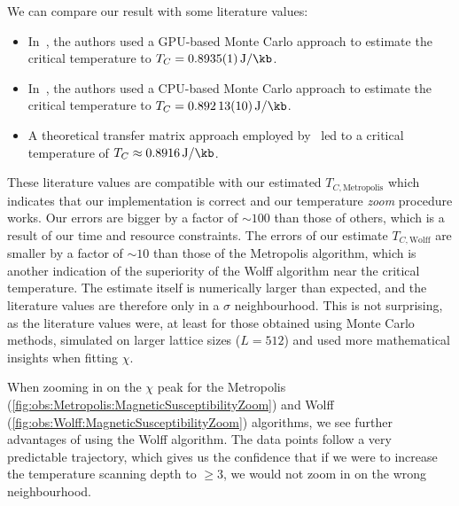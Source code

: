 		We can compare our result with some literature values:
		\begin{itemize}
			\item In~\citet{literature_gpu}, the authors used a GPU-based Monte Carlo approach to estimate the critical temperature to $T_C=\SI{0.8935(1)}{\J\per\kb}$.
			\item In~\citet{literature_cpu}, the authors used a CPU-based Monte Carlo approach to estimate the critical temperature to $T_C=\SI{0.89213(10)}{\J\per\kb}$.
			\item A theoretical transfer matrix approach employed by~\cite{literature_theo} led to a critical temperature of $T_C \approx \SI{0.8916}{\J\per\kb}$.
		\end{itemize}
		These literature values are compatible with our estimated $T_{C, \text{Metropolis}}$ which indicates that our implementation is correct and our temperature \emph{zoom} procedure works. Our errors are bigger by a factor of $\sim 100$ than those of others, which is a result of our time and resource constraints. The errors of our estimate $T_{C, \text{Wolff}}$ are smaller by a factor of $\sim 10$ than those of the Metropolis algorithm, which is another indication of the superiority of the Wolff algorithm near the critical temperature. The estimate itself is numerically larger than expected, and the literature values are therefore only in a $\sigma$ neighbourhood. This is not surprising, as the literature values were, at least for those obtained using Monte Carlo methods, simulated on larger lattice sizes ($L = 512$) and used more mathematical insights when fitting $\chi$.

		When zooming in on the $\chi$ peak for the Metropolis (\cref{fig:obs:Metropolis:MagneticSusceptibilityZoom}) and Wolff (\cref{fig:obs:Wolff:MagneticSusceptibilityZoom}) algorithms, we see further advantages of  using the Wolff algorithm. The data points follow a very predictable trajectory,  which gives us the confidence that if we were to increase the temperature scanning depth to $\geq 3$, we would not zoom in on the wrong neighbourhood.
